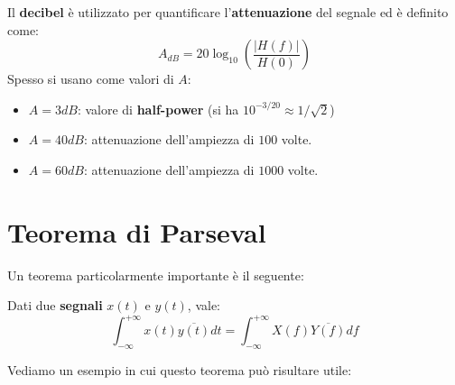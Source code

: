 \begin{remark}
    Il \textbf{decibel} è utilizzato per quantificare l'\textbf{attenuazione} 
    del segnale ed è definito come:
    \[
        A_{dB} = 20 \log_{10} \left( \frac{|H(f)|}{H(0)} \right)
    \] 
    Spesso si usano come valori di $A$:
    \begin{itemize}
        \item $A=3dB$: valore di \textbf{half-power} (si ha $10^{-3/20} \approx 1/\sqrt{2}$)
        \item $A=40dB$: attenuazione dell'ampiezza di $100$ volte.
        \item $A=60dB$: attenuazione dell'ampiezza di $1000$ volte.
    \end{itemize}
\end{remark}


\section{Teorema di Parseval}

Un teorema particolarmente importante è il seguente:

\begin{theorem}
    Dati due \textbf{segnali} $x(t)$ e $y(t)$, vale:
    \[
        \int_{-\infty}^{+\infty} x(t) \overline{y(t)} dt = 
        \int_{-\infty}^{+\infty} X(f) \overline{Y(f)} df  
    \] 
\end{theorem}

Vediamo un esempio in cui questo teorema può risultare utile:

